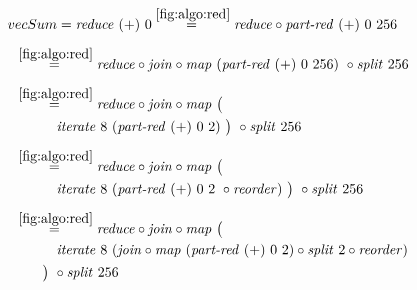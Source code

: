 \begin{align*}
  &\hspace{-1.5em}vecSum = \reduce\ (+)\ 0
%
  \overset{\ref{fig:algo:red}}{=\hspace{.2em}}
      \reduce \circ \partRed\ (+)\ 0\ 256\\[.5em]
%
  &\hspace{-2em}\quad\begin{aligned}
    &\overset{\ref{fig:algo:red}}{=\hspace{.2em}}
      \reduce \circ \join \circ \map\ (\partRed\ (+)\ 0\ 256)\ \circ \splitN\ 256
  \end{aligned}\\[.5em]
%
  &\hspace{-2em}\quad\begin{aligned}
    &\overset{\ref{fig:algo:red}}{=\hspace{.2em}}
      \reduce \circ \join \circ \map\ \big(\\
    &\qquad\quad\iterateN\ 8\ (\partRed\ (+)\ 0\ 2)\ \big)\ \circ \splitN\ 256
  \end{aligned}\\[.5em]
%
  &\hspace{-2em}\quad\begin{aligned}
    &\overset{\ref{fig:algo:red}}{=\hspace{.2em}}
      \reduce \circ \join \circ \map\ \big(\\
    &\qquad\quad\iterateN\ 8\ (\partRed\ (+)\ 0\ 2\ \circ \reorder)\ \big)\ \circ \splitN\ 256
  \end{aligned}\\[.5em]
%
  &\hspace{-2em}\quad\begin{aligned}
    &\overset{\ref{fig:algo:red}}{=\hspace{.2em}}
      \reduce \circ \join \circ \map\ \big(\\
    &\qquad\quad\iterateN\ 8\ (\join \circ \map\ (\partRed\ (+)\ 0\ 2) \circ \splitN\ 2\circ \reorder)\\
    &\qquad\big)\ \circ \splitN\ 256
  \end{aligned}\\[.5em]
%
\end{align*}

